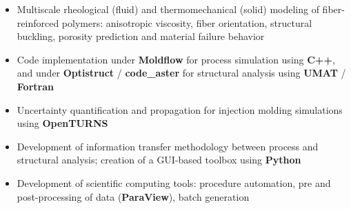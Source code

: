 \documentclass[10pt,a4paper]{altacv}
\begin{document}

\pagestyle{fancy}
\fancyheadoffset{8cm}
\fancyhf{}
\renewcommand{\headrulewidth}{0pt}

\begin{fullwidth}
\makecvheader
\end{fullwidth}



\begin{itemize}
\item Multiscale rheological (fluid) and thermomechanical (solid) modeling of fiber-reinforced polymers: anisotropic viscosity, fiber orientation, structural buckling, porosity prediction and material failure behavior
\item Code implementation under \textbf{Moldflow} for process simulation using \textbf{C++}, and under \textbf{Optistruct} / \textbf{code\_aster} for structural analysis using \textbf{UMAT} / \textbf{Fortran}
\item Uncertainty quantification and propagation for injection molding simulations using \textbf{OpenTURNS}
\item Development of information transfer methodology between process and structural analysis; creation of a GUI-based toolbox using \textbf{Python}
\item Development of scientific computing tools: procedure automation, pre and post-processing of data (\textbf{ParaView}), batch generation
\end{itemize}
\end{document}
